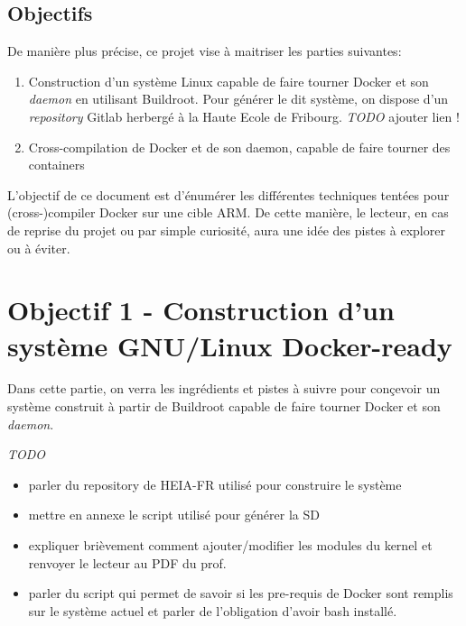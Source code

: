 \documentclass[11pt,a4paper,oneside]{article}
\begin{document}
\section{Objectifs}

De manière plus précise, ce projet vise à maitriser les parties suivantes:

\begin{enumerate}
  \item Construction d'un système Linux capable de faire tourner Docker et son \emph{daemon} en utilisant Buildroot. Pour générer le dit système, on dispose d'un \emph{repository} Gitlab herbergé à la Haute Ecole de Fribourg. \emph{TODO} ajouter lien !

  \item Cross-compilation de Docker et de son daemon, capable de faire tourner des containers
\end{enumerate}

L'objectif de ce document est d'énumérer les différentes techniques tentées pour (cross-)compiler Docker sur une cible ARM. De cette manière, le lecteur, en cas de reprise du projet ou par simple curiosité, aura une idée des pistes à explorer ou à éviter.



\chapter{Objectif 1 - Construction d'un système GNU/Linux Docker-ready}

Dans cette partie, on verra les ingrédients et pistes à suivre pour conçevoir un système construit à partir de Buildroot capable de faire tourner Docker et son \emph{daemon}.


\emph{TODO}

\begin{itemize}
  \item{parler du repository de HEIA-FR utilisé pour construire le système}
  \item{mettre en annexe le script utilisé pour générer la SD}
  \item{expliquer brièvement comment ajouter/modifier les modules du kernel et  renvoyer le lecteur au PDF du prof.}
    \item{parler du script qui permet de savoir si les pre-requis de Docker sont remplis sur le système actuel et parler de l'obligation d'avoir bash installé.}
\end{itemize}
\end{document}
